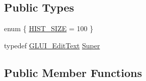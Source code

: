 \subsection*{Public Types}
\begin{DoxyCompactItemize}
\item 
enum \{ \hyperlink{class_g_l_u_i___command_line_afcd6d744f2444c5a8cfbe053b5f37cd6a991ecacadb37c63013e7e24f4e86496f}{H\+I\+S\+T\+\_\+\+S\+I\+Z\+E} = 100
 \}
\item 
typedef \hyperlink{class_g_l_u_i___edit_text}{G\+L\+U\+I\+\_\+\+Edit\+Text} \hyperlink{class_g_l_u_i___command_line_af9db00326863efa876cbb5c6b2d255b7}{Super}
\end{DoxyCompactItemize}
\subsection*{Public Member Functions}

